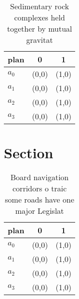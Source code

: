 \documentclass[a4paper]{article}
\begin{document}
\begin{table}
\begin{adjustbox}{width=0.9\columnwidth}
\begin{tabular}{|l|l|l|}
\hline
\textbf{plan} & \multicolumn{1}{c|}{\textbf{0}} & \multicolumn{1}{c|}{\textbf{1}} \\ \hline
\textbf{$a_0$}  & (0,0) & (1,0) \\ \hline
\textbf{$a_1$}  & (0,0) & (1,0) \\ \hline
\textbf{$a_2$}  & (0,0) & (1,0) \\ \hline
\textbf{$a_3$}  & (0,0) & (1,0) \\ \hline
\end{tabular}
\end{adjustbox}
\caption{Sedimentary rock complexes held together by mutual gravitat
}
\end{table}

\section{Section}

\begin{table}
\begin{adjustbox}{width=0.9\columnwidth}
\begin{tabular}{|l|l|l|}
\hline
\textbf{plan} & \multicolumn{1}{c|}{\textbf{0}} & \multicolumn{1}{c|}{\textbf{1}} \\ \hline
\textbf{$a_0$}  & (0,0) & (1,0) \\ \hline
\textbf{$a_1$}  & (0,0) & (1,0) \\ \hline
\textbf{$a_2$}  & (0,0) & (1,0) \\ \hline
\textbf{$a_3$}  & (0,0) & (1,0) \\ \hline
\end{tabular}
\end{adjustbox}
\caption{Board navigation corridors o traic some roads have one major Legislat
}
\end{table}
\end{document}
